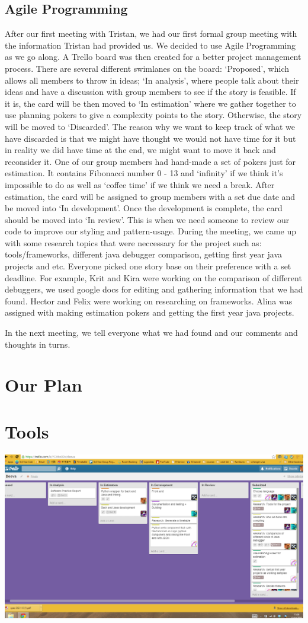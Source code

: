 \documentclass[11pt]{article}
\begin{document}
\subsection{Agile Programming}
After our first meeting with Tristan, we had our first formal group meeting with the information Tristan had provided us. We decided to use Agile Programming as we go along. A Trello board was then created for a better project management process. There are several different swimlanes on the board: ‘Proposed’, which allows all members to throw in ideas; ‘In analysis’, where people talk about their ideas and have a discussion with group members to see if the story is feasible. If it is, the card will be then moved to ‘In estimation’ where we gather together to use planning pokers to give a complexity points to the story. Otherwise, the story will be moved to ‘Discarded’. The reason why we want to keep track of what we have discarded is that we might have thought we would not have time for it but in reality we did have time at the end, we might want to move it back and reconsider it. One of our group members had hand-made a set of pokers just for estimation. It contains Fibonacci number 0 - 13 and ‘infinity’ if we think it’s impossible to do as well as ‘coffee time’ if we think we need a break. After estimation, the card will be assigned to group members with a set due date and be moved into ‘In development’. Once the development is complete, the card should be moved into ‘In review’. This is when we need someone to review our code to improve our styling and pattern-usage. During the meeting, we came up with some research topics that were neccessary for the project such as: tools/frameworks, different java debugger comparison, getting first year java projects and etc. Everyone picked one story base on their preference with a set deadline. For example, Krit and Kira were working on the comparison of different debuggers, we used google docs for editing and gathering information that we had found. Hector and Felix were working on researching on frameworks. Alina was assigned with making estimation pokers and getting the first year java projects. 

In the next meeting, we tell everyone what we had found and our comments and thoughts in turns.

\section{Our Plan}

\section{Tools}


\includegraphics[width=\textwidth]{TrelloBoard.png}
\end{document}
